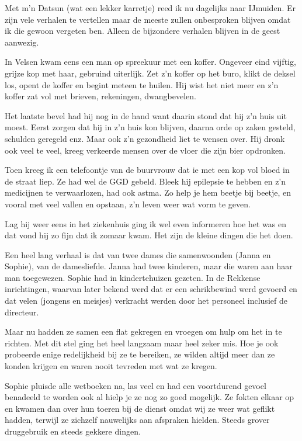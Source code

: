 \documentclass[10pt,twoside,openright]{memoir}
\begin{document}
Met m’n Datsun (wat een lekker karretje) reed ik nu dagelijks naar IJmuiden. Er zijn vele verhalen te vertellen maar de meeste zullen onbesproken blijven omdat ik die gewoon vergeten ben. Alleen de bijzondere verhalen blijven in de geest aanwezig.

In Velsen kwam eens een man op spreekuur met een koffer. Ongeveer eind vijftig, grijze kop met haar, gebruind uiterlijk. Zet z’n koffer op het buro, klikt de deksel los, opent de koffer en begint meteen te huilen. Hij wist het niet meer en z’n koffer zat vol met brieven, rekeningen, dwangbevelen. 

Het laatste bevel had hij nog in de hand want daarin stond dat hij z’n huis uit moest. Eerst zorgen dat hij in z’n huis kon blijven, daarna orde op zaken gesteld, schulden geregeld enz. Maar ook z’n gezondheid liet te wensen over. Hij dronk ook veel te veel, kreeg verkeerde mensen over de vloer die zijn bier opdronken. 

Toen kreeg ik een telefoontje van de buurvrouw dat ie met een kop vol bloed in de straat liep. Ze had wel de GGD gebeld. Bleek hij epilepsie te hebben en z’n medicijnen te verwaarlozen, had ook astma. Zo help je hem beetje bij beetje, en vooral met veel vallen en opstaan, z’n leven weer wat vorm te geven. 

Lag hij weer eens in het ziekenhuis ging ik wel even informeren hoe het was en dat vond hij zo fijn dat ik zomaar kwam. Het zijn de kleine dingen die het doen.

Een heel lang verhaal is dat van twee dames die samenwoonden (Janna en Sophie), van de damesliefde. Janna had twee kinderen, maar die waren aan haar man toegewezen. Sophie had in kindertehuizen gezeten. In de Rekkense inrichtingen, waarvan later bekend werd dat er een schrikbewind werd gevoerd en dat velen (jongens en meisjes) verkracht werden door het personeel inclusief de directeur. 

Maar nu hadden ze samen een flat gekregen en vroegen om hulp om het in te richten. Met dit stel ging het heel langzaam maar heel zeker mis. Hoe je ook probeerde enige redelijkheid bij ze te bereiken, ze wilden altijd meer dan ze konden krijgen en waren nooit tevreden met wat ze kregen. 

Sophie pluisde alle wetboeken na, las veel en had een voortdurend gevoel benadeeld te worden ook al hielp je ze nog zo goed mogelijk. Ze fokten elkaar op en kwamen dan over hun toeren bij de dienst omdat wij ze weer wat geflikt hadden, terwijl ze zichzelf nauwelijks aan afspraken hielden. Steeds grover druggebruik en steeds gekkere dingen. 
\end{document}
